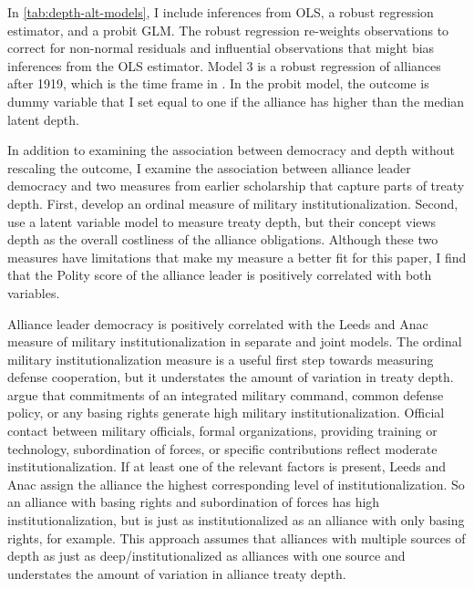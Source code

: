 \documentclass[12pt]{article}
\begin{document}
In \autoref{tab:depth-alt-models}, I include inferences from OLS, a robust regression estimator, and a probit GLM. 
The robust regression re-weights observations to correct for non-normal residuals and influential observations that might bias inferences from the OLS estimator. 
Model 3 is a robust regression of alliances after 1919, which is the time frame in \citet{Mattes2012}. 
In the probit model, the outcome is dummy variable that I set equal to one if the alliance has higher than the median latent depth. 


In addition to examining the association between democracy and depth without rescaling the outcome, I examine the association between alliance leader democracy and two measures from earlier scholarship that capture parts of treaty depth. 
First, \citet{LeedsAnac2005} develop an ordinal measure of military institutionalization.
Second, \citet{BensonClinton2016} use a latent variable model to measure treaty depth, but their concept views depth as the overall costliness of the alliance obligations. 
Although these two measures have limitations that make my measure a better fit for this paper, I find that the Polity score of the alliance leader is positively correlated with both variables.


Alliance leader democracy is positively correlated with the Leeds and Anac measure of military institutionalization in separate and joint models.
The ordinal military institutionalization measure is a useful first step towards measuring defense cooperation, but it understates the amount of variation in treaty depth. 
\citet{LeedsAnac2005} argue that commitments of an integrated military command, common defense policy, or any basing rights generate high military institutionalization. 
Official contact between military officials, formal organizations, providing training or technology, subordination of forces, or specific contributions reflect moderate institutionalization. 
If at least one of the relevant factors is present, Leeds and Anac assign the alliance the highest corresponding level of institutionalization. 
So an alliance with basing rights and subordination of forces has high institutionalization, but is just as institutionalized as an alliance with only basing rights, for example. 
This approach assumes that alliances with multiple sources of depth as just as deep/institutionalized as alliances with one source and understates the amount of variation in alliance treaty depth.
\end{document}
